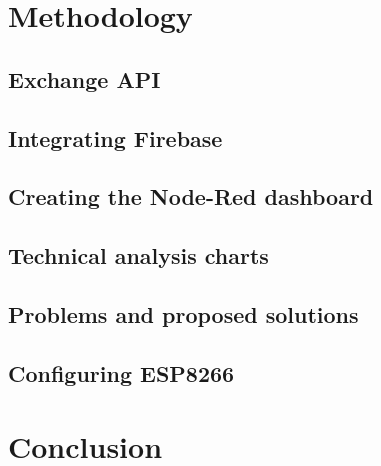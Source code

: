 \section{Methodology}

\subsection{Exchange API}

\subsection{Integrating Firebase}

\subsection{Creating the Node-Red dashboard}

\subsection{Technical analysis charts}

\subsection{Problems and proposed solutions}

\subsection{Configuring ESP8266}

\section{Conclusion}

